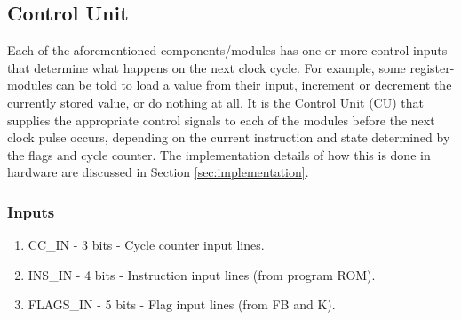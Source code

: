 \subsection{Control Unit} \label{sec:architecture:cu}
Each of the aforementioned components/modules has one or more control inputs that determine what happens on the next clock cycle. For example, some register-modules can be told to load a value from their input, increment or decrement the currently stored value, or do nothing at all. It is the Control Unit (CU) that supplies the appropriate control signals to each of the modules before the next clock pulse occurs, depending on the current instruction and state determined by the flags and cycle counter. The implementation details of how this is done in hardware are discussed in Section \ref{sec:implementation}.

\subsubsection*{Inputs}
\begin{enumerate}
\itemsep0em
\item CC\_IN - 3 bits - Cycle counter input lines.
\item INS\_IN - 4 bits - Instruction input lines (from program ROM).
\item FLAGS\_IN - 5 bits - Flag input lines (from FB and K).
\end{enumerate}


